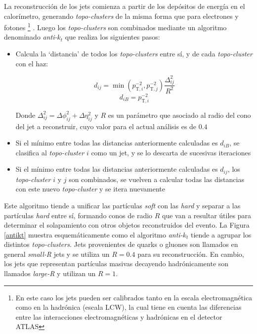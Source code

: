 La reconstrucción de los jets comienza a partir de los depósitos de energía en el calorímetro, generando \textit{topo-clusters} de la misma forma que para electrones y fotones \footnote{En este caso los jets pueden ser calibrados tanto en la escala electromagnética como en la hadrónica (escala LCW), la cual tiene en cuenta las diferencias entre las interacciones electromagnéticas y hadrónicas en el detector ATLAS} \cite{Lampl:1099735}. Luego los \textit{topo-clusters} son combinados mediante un algoritmo denominado \textit{anti-$k_t$} \cite{Cacciari:2008gp} que realiza los siguientes pasos:

\begin{itemize}
	\item Calcula la `distancia' de todos los \textit{topo-clusters} entre sí, y de cada \textit{topo-cluster} con el haz:

	\begin{equation}
		d_{ij} = \min(p_{\text{T},i}^{-2}, p_{\text{T},j}^{-2})\frac{\Delta_{ij}^{2}}{R^{2}}
	\end{equation}
	\begin{equation}
		d_{iB} = p_{\text{T},i}^{-2}
	\end{equation}

	Donde $\Delta_{ij}^{2} = \Delta\phi_{ij}^{2} + \Delta\eta_{ij}^{2}$ y $R$ es un parámetro que asociado al radio del cono del jet a reconstruir, cuyo valor para el actual análisis es de $0.4$

	\item Si el mínimo entre todas las distancias anteriormente calculadas es $d_{iB}$, se clasifica al \textit{topo-cluster} $i$ como un jet, y se lo descarta de sucesivas iteraciones

	\item Si el mínimo entre todas las distancias anteriormente calculadas es $d_{ij}$, los \textit{topo-cluster} $i$ y $j$ son combinados, se vuelven a calcular todas las distancias con este nuevo \textit{topo-cluster} y se itera nuevamente 

\end{itemize}

Este algoritmo tiende a unificar las partículas \textit{soft} con las \textit{hard} y separar a las partículas \textit{hard} entre sí, formando conos de radio $R$ que van a resultar útiles para determinar el solapamiento con otros objetos reconstruidos del evento. La Figura \ref{antikt} muestra esquemáticamente como el algoritmo \textit{anti-$k_t$} tiende a agrupar los distintos \textit{topo-clusters}. Jets provenientes de quarks o gluones son llamados en general \textit{small-R} jets y se utiliza un $R=0.4$ para su reconstrucción. En cambio, los jets que representan partículas masivas decayendo hadrónicamente son llamados \textit{large-R} y utilizan un $R=1$.

